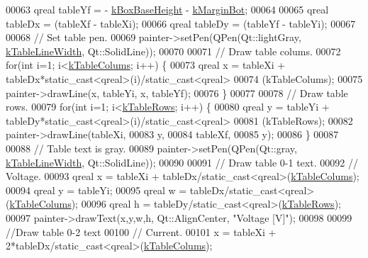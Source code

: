 \begin{DoxyCode}
00063   qreal tableYf = - \hyperlink{class_info_bar_a28fb5e5d6d399d9327f67aa768d4a3d8}{kBoxBaseHeight} - \hyperlink{class_info_bar_a67eb740893ed91c75f237cee756648cc}{kMarginBot};
00064 
00065   qreal tableDx = (tableXf - tableXi);
00066   qreal tableDy = (tableYf - tableYi);
00067 
00068   \textcolor{comment}{// Set table pen.}
00069   painter->setPen(QPen(Qt::lightGray, \hyperlink{class_info_bar_a8d9aadb8292b5884eb1c02e18d36d073}{kTableLineWidth}, Qt::SolidLine));
00070 
00071   \textcolor{comment}{// Draw table colums.}
00072   \textcolor{keywordflow}{for}(\textcolor{keywordtype}{int} i=1; i<\hyperlink{class_info_bar_a57e9e7c40a6fd2a56dd47a4512d65489}{kTableColums}; i++) \{
00073     qreal x = tableXi + tableDx*\textcolor{keyword}{static\_cast<}qreal\textcolor{keyword}{>}(i)/static\_cast<qreal>
00074               (kTableColums);
00075     painter->drawLine(x, tableYi, x, tableYf);
00076   \}
00077 
00078   \textcolor{comment}{// Draw table rows.}
00079   \textcolor{keywordflow}{for}(\textcolor{keywordtype}{int} i=1; i<\hyperlink{class_info_bar_ad54d2dd19a63caf9d2476aace60ae3c5}{kTableRows}; i++) \{
00080     qreal y = tableYi + tableDy*\textcolor{keyword}{static\_cast<}qreal\textcolor{keyword}{>}(i)/static\_cast<qreal>
00081               (kTableRows);
00082     painter->drawLine(tableXi,
00083                       y,
00084                       tableXf,
00085                       y);
00086   \}
00087 
00088   \textcolor{comment}{// Table text is gray.}
00089   painter->setPen(QPen(Qt::gray, \hyperlink{class_info_bar_a8d9aadb8292b5884eb1c02e18d36d073}{kTableLineWidth}, Qt::SolidLine));
00090 
00091   \textcolor{comment}{// Draw table 0-1 text.}
00092   \textcolor{comment}{// Voltage.}
00093   qreal x = tableXi + tableDx/\textcolor{keyword}{static\_cast<}qreal\textcolor{keyword}{>}(\hyperlink{class_info_bar_a57e9e7c40a6fd2a56dd47a4512d65489}{kTableColums});
00094   qreal y = tableYi;
00095   qreal w = tableDx/\textcolor{keyword}{static\_cast<}qreal\textcolor{keyword}{>}(\hyperlink{class_info_bar_a57e9e7c40a6fd2a56dd47a4512d65489}{kTableColums});
00096   qreal h = tableDy/\textcolor{keyword}{static\_cast<}qreal\textcolor{keyword}{>}(\hyperlink{class_info_bar_ad54d2dd19a63caf9d2476aace60ae3c5}{kTableRows});
00097   painter->drawText(x,y,w,h, Qt::AlignCenter, \textcolor{stringliteral}{"Voltage [V]"});
00098 
00099   \textcolor{comment}{//Draw table 0-2 text}
00100   \textcolor{comment}{// Current.}
00101   x = tableXi + 2*tableDx/\textcolor{keyword}{static\_cast<}qreal\textcolor{keyword}{>}(\hyperlink{class_info_bar_a57e9e7c40a6fd2a56dd47a4512d65489}{kTableColums});

\end{DoxyCode}
